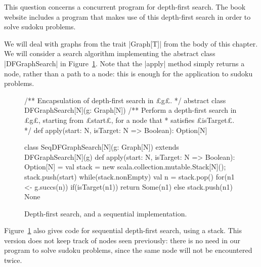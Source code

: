 \begin{question}
\label{ex:dfs} 
This question concerns a concurrent program for depth-first search.  The book
website includes a program that makes use of this depth-first search in order
to solve sudoku problems.

We will deal with graphs from the trait |Graph[T]| from the body of this
chapter.  We will consider a search algorithm implementing the abstract class
|DFGraphSearch| in Figure~\ref{fig:dfs-seq}.
%
%
Note that the |apply| method simply returns a node, rather than a path to a
node: this is enough for the application to sudoku problems.


\begin{figure}
\begin{scala}
/** Encapsulation of depth-first search in £g£. */
abstract class DFGraphSearch[N](g: Graph[N]){
  /** Perform a depth-first search in £g£, starting from £start£, for a node that
    * satisfies £isTarget£.  */
  def apply(start: N, isTarget: N => Boolean): Option[N] 
}

class SeqDFGraphSearch[N](g: Graph[N]) extends DFGraphSearch[N](g){
  def apply(start: N, isTarget: N => Boolean): Option[N] = {
    val stack = new scala.collection.mutable.Stack[N](); stack.push(start)
    while(stack.nonEmpty){
      val n = stack.pop()
      for(n1 <- g.succs(n)){
        if(isTarget(n1)) return Some(n1) else stack.push(n1)
      }
    }
    None
  }
}
\end{scala}
\caption{Depth-first search, and a sequential implementation.}
\label{fig:dfs-seq}
\end{figure}

Figure~\ref{fig:dfs-seq} also gives code for sequential depth-first search,
using a stack.  This version does not keep track of nodes seen previously:
there is no need in our program to solve sudoku problems, since the same node
will not be encountered twice.



\end{question}
